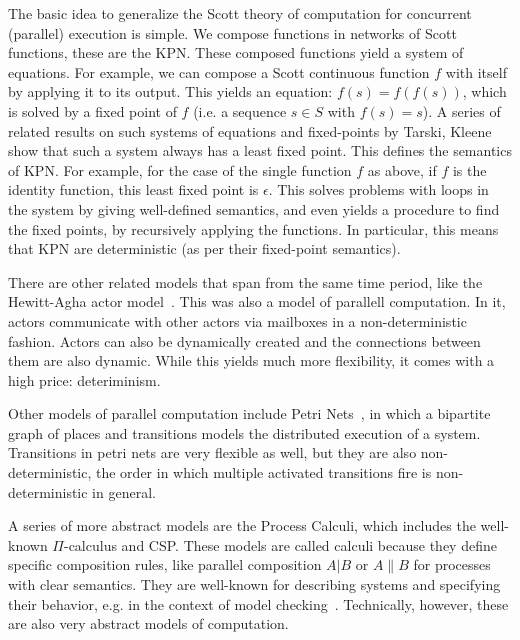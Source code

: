 The basic idea to generalize the Scott theory of computation for concurrent (parallel) execution is simple.
We compose functions in networks of Scott functions, these are the \ac{KPN}.
These composed functions yield a system of equations.
For example, we can compose a Scott continuous function $f$ with itself by applying it to its output.
This yields an equation: $f(s) = f(f(s))$, which is solved by a fixed point of $f$ (i.e. a sequence $s \in S$ with $f(s)= s$).
A series of related results on such systems of equations and fixed-points by Tarski, Kleene show that such a system always has a least fixed point.
This defines the semantics of \ac{KPN}.
For example, for the case of the single function $f$ as above, if $f$ is the identity function, this least fixed point is $\epsilon$.
This solves problems with loops in the system by giving well-defined semantics, and even yields a procedure to find the fixed points, by recursively applying the functions.
In particular, this means that \ac{KPN} are deterministic (as per their fixed-point semantics).

There are other related models that span from the same time period, like the Hewitt-Agha actor model~\cite{DBLP:conf/ijcai/HewittBS73,Agha:86:Actors}.
This was also a model of parallell computation. In it, actors communicate with other actors via mailboxes in a non-deterministic fashion. 
Actors can also be dynamically created and the connections between them are also dynamic.
While this yields much more flexibility, it comes with a high price: deteriminism. 

Other models of parallel computation include Petri Nets~\cite{petri1962nets}, in which a bipartite graph of places and transitions models the distributed execution of a system.
Transitions in petri nets are very flexible as well, but they are also non-deterministic, the order in which multiple activated transitions fire is non-deterministic in general.

A series of more abstract models are the Process Calculi, which includes the well-known $\Pi$-calculus and \ac{CSP}.
These models are called calculi because they define specific composition rules, like parallel composition $A | B$ or $A \| B$ for processes with clear semantics. 
They are well-known for describing systems and specifying their behavior, e.g. in the context of model checking~\cite{baier_model_checking}.
Technically, however, these are also very abstract models of computation.

